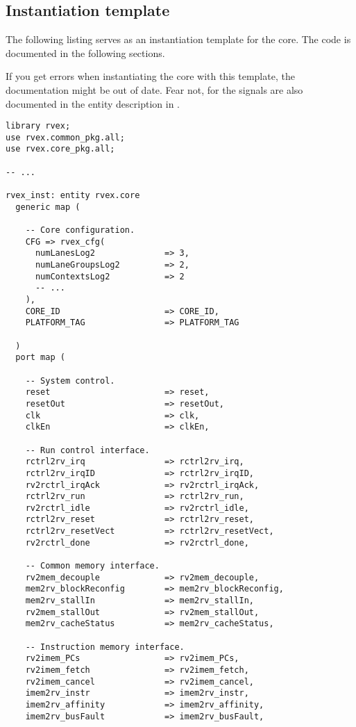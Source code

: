 \subsection{Instantiation template}
\label{sec:core-ug-inst-template}

The following listing serves as an instantiation template for the core. The code
is documented in the following sections.

If you get errors when instantiating the core with this template, the
documentation might be out of date. Fear not, for the signals are also
documented in the entity description in .

\begin{lstlisting}[numbers=none]
library rvex;
use rvex.common_pkg.all;
use rvex.core_pkg.all;

-- ...

rvex_inst: entity rvex.core
  generic map (
    
    -- Core configuration.
    CFG => rvex_cfg(
      numLanesLog2              => 3,
      numLaneGroupsLog2         => 2,
      numContextsLog2           => 2
      -- ...
    ),
    CORE_ID                     => CORE_ID,
    PLATFORM_TAG                => PLATFORM_TAG
    
  )
  port map (
    
    -- System control.
    reset                       => reset,
    resetOut                    => resetOut,
    clk                         => clk,
    clkEn                       => clkEn,
    
    -- Run control interface.
    rctrl2rv_irq                => rctrl2rv_irq,
    rctrl2rv_irqID              => rctrl2rv_irqID,
    rv2rctrl_irqAck             => rv2rctrl_irqAck,
    rctrl2rv_run                => rctrl2rv_run,
    rv2rctrl_idle               => rv2rctrl_idle,
    rctrl2rv_reset              => rctrl2rv_reset,
    rctrl2rv_resetVect          => rctrl2rv_resetVect,
    rv2rctrl_done               => rv2rctrl_done,
    
    -- Common memory interface.
    rv2mem_decouple             => rv2mem_decouple,
    mem2rv_blockReconfig        => mem2rv_blockReconfig,
    mem2rv_stallIn              => mem2rv_stallIn,
    rv2mem_stallOut             => rv2mem_stallOut,
    mem2rv_cacheStatus          => mem2rv_cacheStatus,
    
    -- Instruction memory interface.
    rv2imem_PCs                 => rv2imem_PCs,
    rv2imem_fetch               => rv2imem_fetch,
    rv2imem_cancel              => rv2imem_cancel,
    imem2rv_instr               => imem2rv_instr,
    imem2rv_affinity            => imem2rv_affinity,
    imem2rv_busFault            => imem2rv_busFault,
    

\end{lstlisting}
